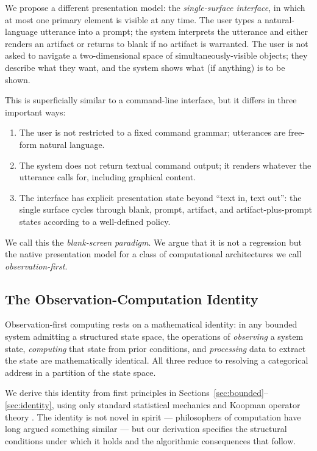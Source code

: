 \documentclass[11pt,a4paper]{article}
\theoremstyle{definition}
\theoremstyle{remark}
\begin{document}
We propose a different presentation model: the \emph{single-surface interface}, in which at most one primary element is visible at any time. The user types a natural-language utterance into a prompt; the system interprets the utterance and either renders an artifact or returns to blank if no artifact is warranted. The user is not asked to navigate a two-dimensional space of simultaneously-visible objects; they describe what they want, and the system shows what (if anything) is to be shown.

This is superficially similar to a command-line interface, but it differs in three important ways:
\begin{enumerate}
    \item The user is not restricted to a fixed command grammar; utterances are free-form natural language.
    \item The system does not return textual command output; it renders whatever the utterance calls for, including graphical content.
    \item The interface has explicit presentation state beyond ``text in, text out'': the single surface cycles through blank, prompt, artifact, and artifact-plus-prompt states according to a well-defined policy.
\end{enumerate}

We call this the \emph{blank-screen paradigm}. We argue that it is not a regression but the native presentation model for a class of computational architectures we call \emph{observation-first}.

\subsection{The Observation-Computation Identity}

Observation-first computing rests on a mathematical identity: in any bounded system admitting a structured state space, the operations of \emph{observing} a system state, \emph{computing} that state from prior conditions, and \emph{processing} data to extract the state are mathematically identical. All three reduce to resolving a categorical address in a partition of the state space.

We derive this identity from first principles in Sections~\ref{sec:bounded}--\ref{sec:identity}, using only standard statistical mechanics \citep{boltzmann1872further, shannon1948mathematical} and Koopman operator theory \citep{koopman1931hamiltonian, mezic2005spectral}. The identity is not novel in spirit --- philosophers of computation have long argued something similar \citep{chaitin1975randomness, wheeler1990information} --- but our derivation specifies the structural conditions under which it holds and the algorithmic consequences that follow.
\end{document}
